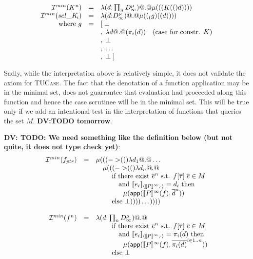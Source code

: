 \begin{itemize}
{\[\begin{array}{rcl}
   {\cal I}^{min}(K^{n})     & = & \mathsf{\lambda} (d {:} \prod_{n}D_{\infty}^\mu) @.@ \mu((({K}(()d)))) \\
   {\cal I}^{min}(\mathop{sel\_K\!_{i}}) & = & \mathsf{\lambda} (d {:} D_{\infty}^{\mu}) @.@ \mu((_(g)((d)))) \\
     \mbox{where } g  & = & [\;\bot \\
                      &   & ,\;\mathsf{\lambda} d @.@ (\pi_i(d))  \quad (\mbox{case for constr. } K) \\
                      &   & ,\;\bot \\
                      &   & ,\;\ldots\\
                      &   & ,\;\bot\; ]
  \end{array}\]}

  Sadly, while the interpretation above is relatively simple, it does not validate the axiom
  for \textsc{TUCase}. The fact that the denotation of a function application may be in the minimal set,
  does not guarrantee that evaluation had proceeded along this function and hence the case scrutinee will
  be in the minimal set. This will be true only if we add an intentional test in the interpretation of
  functions that queries the set $M$. {\bf DV:TODO tomorrow}.

  {\bf DV: TODO: We need something like the definition below (but not quite, it does not type check yet)}:
  {\setlength{\arraycolsep}{2pt}
  \[\begin{array}{rcl}
     \mlinterp{f_{ptr}} & = & \mu(\roll(\ret(\inj{->}(\dlambda d_1 @.@ \ldots  \\
                       &   & \quad \mu(\roll(\ret(\inj{->}(\dlambda d_n @.@ \\
                       &   & \quad\quad\text{ if there exist } \oln{e}{n} \text{ s.t. } f[\taus]\;\ol{e} \in M \\
                       &   & \quad\quad\quad\text{ and } \interp{e_i}{\dbrace{P}^\infty}{\cdot} = d_i\text{ then } \\
                       &   & \quad\quad\quad\quad \mu(\dapp(\dbrace{P}^{\infty}(f),\oln{d}{n})) \\
                       &   & \quad\quad\text{ else } \bot))))\ldots)))) \\ \\
   \mlinterp{f^{n}}  & = & \dlambda (d {:} \prod_{n}D_{\infty}^\mu) @.@  \\
                       &   & \quad\quad\text{ if there exist } \oln{e}{n} \text{ s.t. } f[\taus]\;\ol{e} \in M \\
                       &   & \quad\quad\quad\text{ and } \interp{e_i}{\dbrace{P}^\infty}{\cdot} = \pi_i(d)\text{ then } \\
                       &   & \quad\quad\quad\quad \mu(\dapp(\dbrace{P}^{\infty}(f),\oln{\pi_i(d)}{i \in 1..n})) \\
                       &   & \quad\quad\text{ else } \bot \\ \\


\end{array}\]}
\end{itemize}

